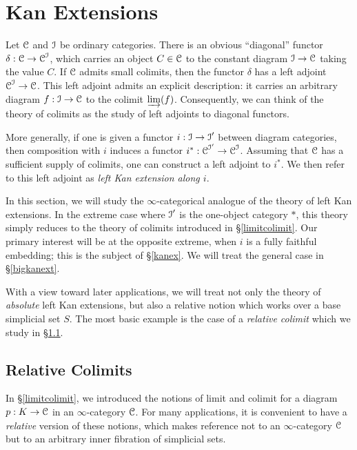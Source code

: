 \section{Kan Extensions}\label{relacoim}
\setcounter{theorem}{0}

Let $\operatorname{\mathcal{C}}$ and $\operatorname{\mathcal{I}}$ be ordinary categories. There is an obvious ``diagonal'' functor $\delta: \operatorname{\mathcal{C}} \rightarrow \operatorname{\mathcal{C}}^{\operatorname{\mathcal{I}}}$, which carries an object $C \in \operatorname{\mathcal{C}}$ to the constant diagram $\operatorname{\mathcal{I}} \rightarrow \operatorname{\mathcal{C}}$ taking the value $C$. If $\operatorname{\mathcal{C}}$ admits small colimits, then the functor $\delta$ has a left adjoint $\operatorname{\mathcal{C}}^{\operatorname{\mathcal{I}}} \rightarrow \operatorname{\mathcal{C}}$. This left adjoint admits an explicit description: it carries an arbitrary diagram $f: \operatorname{\mathcal{I}} \rightarrow \operatorname{\mathcal{C}}$ to the colimit $\operatorname{\varinjlim}(f)$. Consequently, we can think of the theory of colimits as the study of left adjoints to diagonal functors.

More generally, if one is given a functor $i: \operatorname{\mathcal{I}} \rightarrow \operatorname{\mathcal{I}}'$ between diagram categories, then composition with $i$ induces a functor $i^{\ast}: \operatorname{\mathcal{C}}^{\operatorname{\mathcal{I}}'} \rightarrow \operatorname{\mathcal{C}}^{\operatorname{\mathcal{I}}}$. Assuming that $\operatorname{\mathcal{C}}$ has a sufficient supply of colimits, one can construct a left adjoint to $i^{\ast}$.
We then refer to this left adjoint as {\it left Kan extension along $i$}.

In this section, we will study the $\infty$-categorical analogue of the theory of left Kan extensions. 
In the extreme case where $\operatorname{\mathcal{I}}'$ is the one-object category $\ast$, this theory simply reduces to the theory of colimits introduced in \S \ref{limitcolimit}. Our primary interest will be at the opposite extreme, when $i$ is a fully faithful embedding; this is the subject of \S \ref{kanex}. We will treat the general case in \S \ref{bigkanext}.

With a view toward later applications, we will treat not only the theory of {\em absolute} left Kan extensions, but also a relative notion which works over a base simplicial set $S$. The most basic example is the case of a {\it relative colimit} which we study in \S \ref{relcol}.

\subsection{Relative Colimits}\label{relcol}

In \S \ref{limitcolimit}, we introduced the notions of limit and colimit for a diagram
$p: K \rightarrow \operatorname{\mathcal{C}}$ in an $\infty$-category $\operatorname{\mathcal{C}}$. For many applications, it is convenient to have a {\em relative} version of these notions, which makes reference not to an $\infty$-category $\operatorname{\mathcal{C}}$ but to an arbitrary inner fibration of simplicial sets.  

